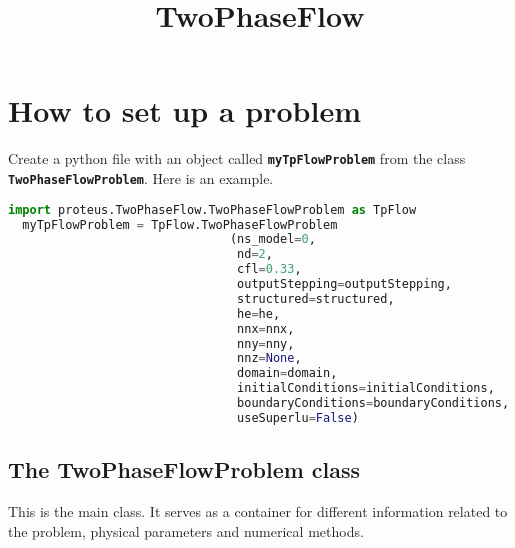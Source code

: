 \documentclass[english,11pt]{article}
\newcommand{\code}[1]{{\bf \large \color{blue}\lstinline{#1}}}
\begin{document}
\title{TwoPhaseFlow}
\date{}
\maketitle

\section{How to set up a problem}

Create a python file with an object called \code{myTpFlowProblem} from
the class \code{TwoPhaseFlowProblem}. Here is an example. 
\vspace{2ex}

\begin{lstlisting}[language=python, frame=single]
  import proteus.TwoPhaseFlow.TwoPhaseFlowProblem as TpFlow
  myTpFlowProblem = TpFlow.TwoPhaseFlowProblem
                               (ns_model=0,
                                nd=2,
                                cfl=0.33,
                                outputStepping=outputStepping,
                                structured=structured,
                                he=he,
                                nnx=nnx,
                                nny=nny,
                                nnz=None,
                                domain=domain,
                                initialConditions=initialConditions,
                                boundaryConditions=boundaryConditions,
                                useSuperlu=False)
\end{lstlisting}

\subsection{The TwoPhaseFlowProblem class} 
This is the main class. It serves as a container for different information 
related to the problem, physical parameters and numerical methods.
\end{document}
